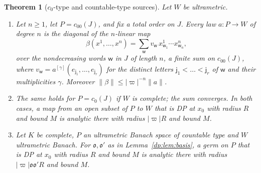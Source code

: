 \documentclass[11pt]{amsart}
\newtheorem{theorem}{Theorem}[section]
\theoremstyle{definition}
\theoremstyle{remark}
\numberwithin{equation}{section}
\newcommand{\abs}[1]{\lvert #1\rvert}
\newcommand{\norm}[1]{\lVert #1\rVert}
\theoremstyle{plain}
\theoremstyle{definition}
\theoremstyle{plain}
\begin{document}
\begin{theorem}[$c_0$-type and countable-type sources]\label{dp:thm:c0-agreement}
Let $W$ be ultrametric.
\begin{enumerate}
\item Let $n\ge1$, let $P=c_{00}(J)$, and fix a total order on $J$. Every law $a\colon P\to W$ of degree $n$ is the diagonal of the $n$\nobreakdash-linear map
\[
 \beta(x^1,\dots,x^n)=\sum_{\mathsf w}v_{\mathsf w}\,x^1_{\mathsf w_1}\cdots x^n_{\mathsf w_n},
\]
over the nondecreasing words $\mathsf w$ in $J$ of length $n$, a finite sum on $c_{00}(J)$, where $v_{\mathsf w}=a^{[\gamma]}(e_{\mathsf j_1},\dots,e_{\mathsf j_r})$ for the distinct letters $\mathsf j_1<\dots<\mathsf j_r$ of $\mathsf w$ and their multiplicities $\gamma$. Moreover $\norm\beta\le\abs\varpi^{-n}\norm a$.
\item The same holds for $P=c_0(J)$ if $W$ is complete; the sum converges. In both cases, a map from an open subset of $P$ to $W$ that is DP at $x_0$ with radius $R$ and bound $M$ is analytic there with radius $\abs\varpi R$ and bound $M$.
\item Let $K$ be complete, $P$ an ultrametric Banach space of countable type and $W$ ultrametric Banach. For $\mathfrak o,\mathfrak o'$ as in Lemma~\ref{dp:lem:basis}, a germ on $P$ that is DP at $x_0$ with radius $R$ and bound $M$ is analytic there with radius $\abs\varpi\mathfrak o\mathfrak o'R$ and bound $M$.
\end{enumerate}
\end{theorem}
\end{document}
